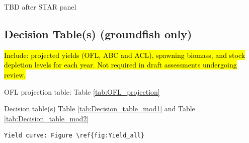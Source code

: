 \documentclass[12pt,]{article}
\begin{document}
TBD after STAR panel

\FloatBarrier

\subsection*{Decision Table(s) (groundfish
only)}\label{decision-tables-groundfish-only}

\hl{Include: projected yields (OFL, ABC and ACL), spawning biomass, and stock 
depletion levels for each year. Not required in draft assessments undergoing review.}

OFL projection table: Table \ref{tab:OFL_projection}

Decision table(s) Table \ref{tab:Decision_table_mod1} and Table
\ref{tab:Decision_table_mod2}

\begin{verbatim}
Yield curve: Figure \ref{fig:Yield_all}
\end{verbatim}
\end{document}
